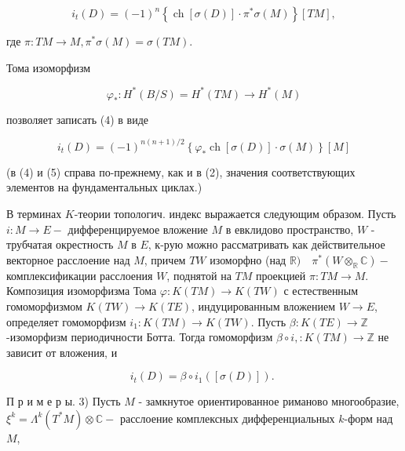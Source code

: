 \documentclass[10pt]{article}
\begin{document}
\[

i_{t}(D)=(-1)^{n}\left\{\operatorname{ch}[\sigma(D)] \cdot \pi^{*} \sigma(M)\right\}[T M],

\]



где $\pi: T M \rightarrow M, \pi^{*} \mathscr{\sigma}(M)=\mathscr{\sigma}(T M)$.



Тома изоморфизм



\[

\varphi_{*}: H^{*}(B / S)=H^{*}(T M) \rightarrow H^{*}(M)

\]



позволяет записать (4) в виде



\[

i_{t}(D)=(-1)^{n(n+1) / 2}\left\{\varphi_{*} \operatorname{ch}[\sigma(D)] \cdot \mathscr{\sigma}(M)\right\}[M]

\]



(в (4) и (5) справа по-прежнему, как и в (2), значения соответствующих элементов на фундаментальных циклах.)



В терминах $K$-теории топологич. индекс выражается следующим образом. Пусть $i: M \rightarrow E-$ дифференцируемое вложение $M$ в евклидово пространство, $W$ - трубчатая окрестность $M$ в $E$, к-рую можно рассматривать как действительное векторное расслоение над $M$, причем $T W$ изоморфно (над $\mathbb{R}) \quad \pi^{*}\left(W \otimes_{\mathbb{R}} \mathbb{C}\right)-$ комплексификации расслоения $W$, поднятой на $T M$ проекцией $\pi: T M \rightarrow M$. Композиция изоморфизма Тома $\varphi: K(T M) \rightarrow K(T W)$ с естественным гомоморфизмом $K(T W) \rightarrow K(T E)$, индуцированным вложением $W \rightarrow E$, определяет гомоморфизм $i_{1}: K(T M) \rightarrow K(T W)$. Пусть $\beta: K(T E) \rightarrow \mathbb{Z}$-изоморфизм периодичности Ботта. Тогда гомоморфизм $\beta \circ i,: K(T M) \rightarrow \mathbb{Z}$ не зависит от вложения, и



\[

i_{t}(D)=\beta \circ i_{1}([\sigma(D)]) \text {. }

\]



П р и м е р ы. 3) Пусть $M$ - замкнутое ориентированное риманово многообразие, $\xi^{k}=\Lambda^{k}\left(T^{*} M\right) \otimes \mathbb{C}-$ расслоение комплексных дифференциальных $k$-форм над $M$,
\end{document}
